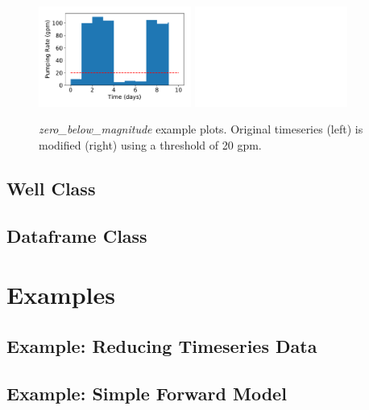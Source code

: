 \documentclass{tufte-book} %
\begin{document}
\begin{figure}[h]
\includegraphics[width=5cm]{python/timeseries_zero_below_magnitude_before.pdf}
\hspace{\fill}
\includegraphics[width=5cm]{python/timeseries_zero_below_magnitude_after.pdf}
\caption{ \emph{zero\_below\_magnitude} example plots. 
    Original timeseries (left) is modified (right) using a threshold of 20 gpm.}
\end{figure}

\section{Well Class}
\lipsum[13-20]

\section{Dataframe Class}
\lipsum[13-20]

\chapter{Examples}

\section{Example: Reducing Timeseries Data}

\section{Example: Simple Forward Model}
\lipsum[13-20]
\end{document}
